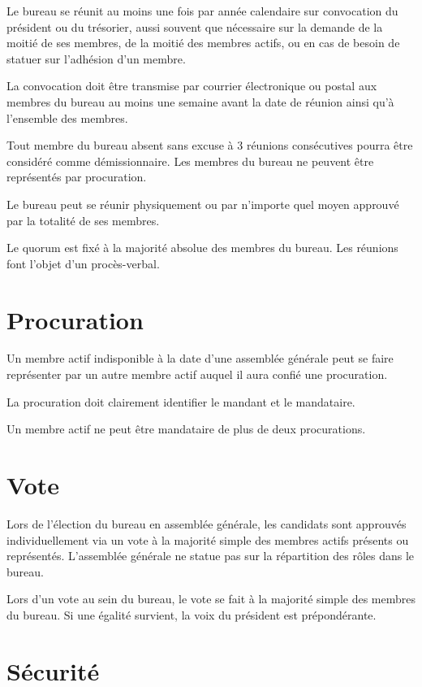 \documentclass[a4paper, 11pt]{article}
\begin{document}
Le bureau se réunit au moins une fois par année calendaire sur convocation du président ou du trésorier, aussi souvent
que nécessaire sur la demande de la moitié de ses membres, de la moitié des membres actifs, ou en cas de besoin de
statuer sur l'adhésion d'un membre.

La convocation doit être transmise par courrier électronique ou postal aux membres du bureau au moins une semaine avant
la date de réunion ainsi qu'à l'ensemble des membres.

Tout membre du bureau absent sans excuse à 3 réunions consécutives pourra être considéré comme démissionnaire.
Les membres du bureau ne peuvent être représentés par procuration.

Le bureau peut se réunir physiquement ou par n'importe quel moyen approuvé par la totalité de ses membres.

Le quorum est fixé à la majorité absolue des membres du bureau.
Les réunions font l'objet d'un procès-verbal.


\section{Procuration} %

Un membre actif indisponible à la date d'une assemblée générale peut se faire représenter par un autre membre actif
auquel il aura confié une procuration.

La procuration doit clairement identifier le mandant et le mandataire.

Un membre actif ne peut être mandataire de plus de deux procurations.


\section{Vote} %

Lors de l'élection du bureau en assemblée générale, les candidats sont approuvés individuellement via un vote à
la majorité simple des membres actifs présents ou représentés.
L'assemblée générale ne statue pas sur la répartition des rôles dans le bureau.

Lors d'un vote au sein du bureau, le vote se fait à la majorité simple des membres du bureau.
Si une égalité survient, la voix du président est prépondérante.


\section{Sécurité} %
\end{document}
